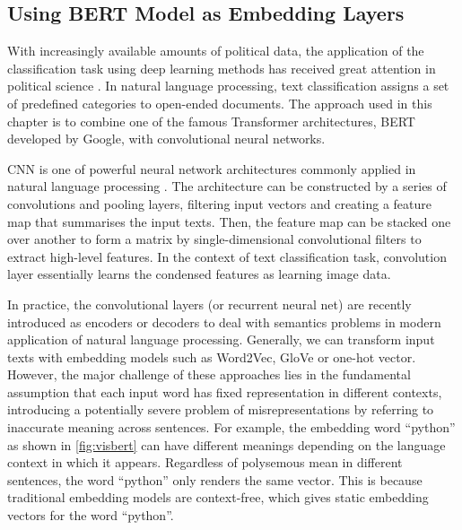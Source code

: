 

\subsection*{Using BERT Model as Embedding Layers}

With increasingly available amounts of political data, the application of the classification task using deep learning methods has received great attention in political science \citep{Chatsiou2020}. In natural language processing, text classification assigns a set of predefined categories to open-ended documents. The approach used in this chapter is to combine one of the famous Transformer architectures, BERT developed by Google, with convolutional neural networks. 

CNN is one of powerful neural network architectures commonly applied in natural language processing \citep{Zhang2015, Zhang2020, Kim2014, Kim2016}. The architecture can be constructed by a series of convolutions and pooling layers, filtering input vectors and creating a feature map that summarises the input texts. Then, the feature map can be stacked one over another to form a matrix by single-dimensional convolutional filters to extract high-level features. In the context of text classification task, convolution layer essentially learns the condensed features as learning image data. 



In practice, the convolutional layers (or recurrent neural net) are recently introduced as encoders or decoders to deal with semantics problems in modern application of natural language processing. Generally, we can transform input texts with embedding models such as Word2Vec, GloVe or one-hot vector. However, the major challenge of these approaches lies in the fundamental assumption that each input word has fixed representation in different contexts, introducing a potentially severe problem of misrepresentations by referring to inaccurate meaning across sentences. For example, the embedding word ``python'' as shown in \autoref{fig:visbert} can have different meanings depending on the language context in which it appears. Regardless of polysemous mean in different sentences, the word ``python'' only renders the same vector. This is because traditional embedding models are context-free, which gives static embedding vectors for the word ``python''. 

